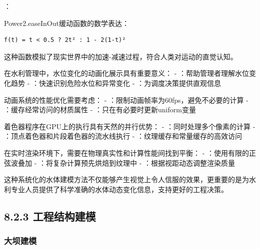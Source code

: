 ：


Power2.easeInOut缓动函数的数学表达：

\begin{lstlisting}
f(t) = t < 0.5 ? 2t² : 1 - 2(1-t)²
\end{lstlisting}

这种函数模拟了现实世界中的加速-减速过程，符合人类对运动的直觉认知。


在水利管理中，水位变化的动画化展示具有重要意义： - ：帮助管理者理解水位变化趋势 - ：快速识别危险水位和异常变化 - ：为调度决策提供直观信息


动画系统的性能优化需要考虑： - ：限制动画帧率为60fps，避免不必要的计算 - ：缓存经常访问的材质属性 - ：只在有必要时更新uniform变量


着色器程序在GPU上的执行具有天然的并行优势： - ：同时处理多个像素的计算 - ：顶点着色器和片段着色器的流水线执行 - ：纹理缓存和常量缓存的高效访问


在实时渲染环境下，需要在物理真实性和计算性能间找到平衡： - ：使用有限的正弦波叠加 - ：将复杂计算预先烘焙到纹理中 - ：根据视距动态调整渲染质量

这种系统化的水体建模方法不仅能够产生视觉上令人信服的效果，更重要的是为水利专业人员提供了科学准确的水体动态变化信息，支持更好的工程决策。

\hypertarget{ux5de5ux7a0bux7ed3ux6784ux5efaux6a21}{%
\subsection{8.2.3 工程结构建模}\label{ux5de5ux7a0bux7ed3ux6784ux5efaux6a21}}

\hypertarget{ux5927ux575dux5efaux6a21}{%
\subsubsection{大坝建模}\label{ux5927ux575dux5efaux6a21}}

